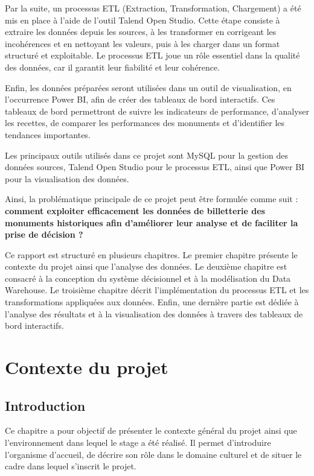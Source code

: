 \documentclass[12pt,a4paper]{report}
\begin{document}
Par la suite, un processus ETL (Extraction, Transformation, Chargement) a été mis en place à l’aide de l’outil Talend Open Studio. Cette étape consiste à extraire les données depuis les sources, à les transformer en corrigeant les incohérences et en nettoyant les valeurs, puis à les charger dans un format structuré et exploitable. Le processus ETL joue un rôle essentiel dans la qualité des données, car il garantit leur fiabilité et leur cohérence.

Enfin, les données préparées seront utilisées dans un outil de visualisation, en l’occurrence Power BI, afin de créer des tableaux de bord interactifs. Ces tableaux de bord permettront de suivre les indicateurs de performance, d’analyser les recettes, de comparer les performances des monuments et d’identifier les tendances importantes.

Les principaux outils utilisés dans ce projet sont MySQL pour la gestion des données sources, Talend Open Studio pour le processus ETL, ainsi que Power BI pour la visualisation des données.

Ainsi, la problématique principale de ce projet peut être formulée comme suit : \textbf{comment exploiter efficacement les données de billetterie des monuments historiques afin d’améliorer leur analyse et de faciliter la prise de décision ?}

Ce rapport est structuré en plusieurs chapitres. Le premier chapitre présente le contexte du projet ainsi que l’analyse des données. Le deuxième chapitre est consacré à la conception du système décisionnel et à la modélisation du Data Warehouse. Le troisième chapitre décrit l’implémentation du processus ETL et les transformations appliquées aux données. Enfin, une dernière partie est dédiée à l’analyse des résultats et à la visualisation des données à travers des tableaux de bord interactifs.

	\chapter{Contexte du projet}
	\section*{Introduction}
	
	Ce chapitre a pour objectif de présenter le contexte général du projet ainsi que l’environnement dans lequel le stage a été réalisé. Il permet d’introduire l’organisme d’accueil, de décrire son rôle dans le domaine culturel et de situer le cadre dans lequel s’inscrit le projet.
	
\end{document}
